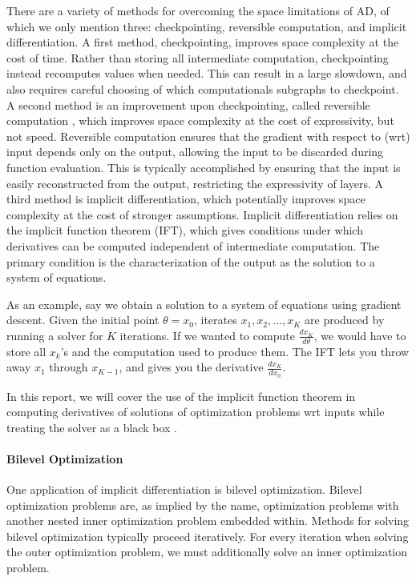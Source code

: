 \documentclass[11pt]{article}
\begin{document}
There are a variety of methods for overcoming the space limitations of AD,
of which we only mention three: checkpointing, reversible computation, and implicit differentiation.
A first method, checkpointing, improves space complexity at the cost of time.
Rather than storing all intermediate computation,
checkpointing instead recomputes values when needed.
This can result in a large slowdown,
and also requires careful choosing of which computationals subgraphs to checkpoint.
A second method is an improvement upon checkpointing, called reversible computation \citep{maclaurin2015reversible,gomez2017reversible},
which improves space complexity at the cost of expressivity, but not speed.
Reversible computation ensures that the gradient with respect to (wrt) input depends only on the output,
allowing the input to be discarded during function evaluation.
This is typically accomplished by ensuring that the input is easily reconstructed from the output,
restricting the expressivity of layers.
A third method is implicit differentiation,
which potentially improves space complexity at the cost of stronger assumptions.
Implicit differentiation relies on the implicit function theorem (IFT),
which gives conditions under which derivatives can be computed independent of
intermediate computation.
The primary condition is the characterization of the output as the solution
to a system of equations.

As an example, say we obtain a solution to a system of equations using gradient descent.
Given the initial point $\theta = x_0$,
iterates $x_1, x_2, ..., x_{K}$ are produced by running a solver for $K$ iterations.
If we wanted to compute $\frac{dx_K}{d\theta}$, we would have to store all $x_k$'s
and the computation used to produce them.
The IFT lets you throw away $x_1$ through $x_{K-1}$, and gives you the derivative
$\frac{dx_{K}}{dx_0}$.

In this report, we will cover the use of the implicit function theorem
in computing derivatives of solutions of optimization problems wrt inputs
while treating the solver as a black box \citep{optnet}.

\paragraph{Bilevel Optimization}
One application of implicit differentiation is bilevel optimization.
Bilevel optimization problems are, as implied by the name,
optimization problems with another nested inner optimization problem embedded within.
Methods for solving bilevel optimization typically proceed iteratively.
For every iteration when solving the outer optimization problem,
we must additionally solve an inner optimization problem.
\end{document}
